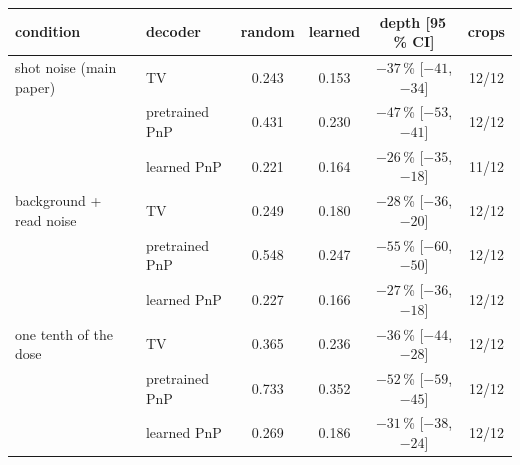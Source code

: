 \begin{tabular}{@{}ll ccc c@{}}\toprule
condition & decoder & random & learned & depth [95\,\% CI] & crops\\\midrule
shot noise (main paper) & TV & 0.243 & 0.153 & $-37$\,\% [$-41$, $-34$] & 12/12\\
 & pretrained PnP & 0.431 & 0.230 & $-47$\,\% [$-53$, $-41$] & 12/12\\
 & learned PnP & 0.221 & 0.164 & $-26$\,\% [$-35$, $-18$] & 11/12\\\midrule
background + read noise & TV & 0.249 & 0.180 & $-28$\,\% [$-36$, $-20$] & 12/12\\
 & pretrained PnP & 0.548 & 0.247 & $-55$\,\% [$-60$, $-50$] & 12/12\\
 & learned PnP & 0.227 & 0.166 & $-27$\,\% [$-36$, $-18$] & 12/12\\\midrule
one tenth of the dose & TV & 0.365 & 0.236 & $-36$\,\% [$-44$, $-28$] & 12/12\\
 & pretrained PnP & 0.733 & 0.352 & $-52$\,\% [$-59$, $-45$] & 12/12\\
 & learned PnP & 0.269 & 0.186 & $-31$\,\% [$-38$, $-24$] & 12/12\\
\bottomrule\end{tabular}

